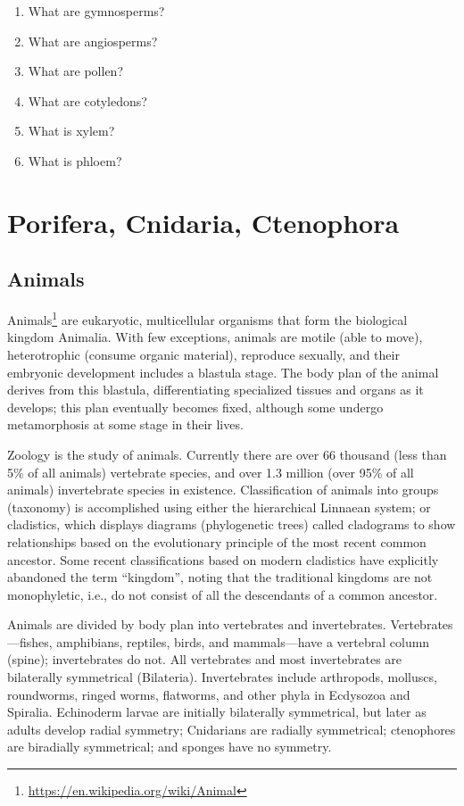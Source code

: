 \documentclass[]{book}
\providecommand{\tightlist}{%
  \setlength{\itemsep}{0pt}\setlength{\parskip}{0pt}}
\let\rmarkdownfootnote\footnote%
\def\footnote{\protect\rmarkdownfootnote}
\renewcommand{\href}[2]{#2\footnote{\url{#1}}}
\theoremstyle{definition}
\theoremstyle{definition}
\theoremstyle{definition}
\theoremstyle{remark}
\begin{document}
\begin{enumerate}
\def\labelenumi{\arabic{enumi}.}
\tightlist
\item
  What are gymnosperms?
\item
  What are angiosperms?
\item
  What are pollen?
\item
  What are cotyledons?
\item
  What is xylem?
\item
  What is phloem?
\end{enumerate}

\chapter{Porifera, Cnidaria,
Ctenophora}\label{porifera-cnidaria-ctenophora}

\section{Animals}\label{animals}

\href{https://en.wikipedia.org/wiki/Animal}{Animals} are eukaryotic,
multicellular organisms that form the biological kingdom Animalia. With
few exceptions, animals are motile (able to move), heterotrophic
(consume organic material), reproduce sexually, and their embryonic
development includes a blastula stage. The body plan of the animal
derives from this blastula, differentiating specialized tissues and
organs as it develops; this plan eventually becomes fixed, although some
undergo metamorphosis at some stage in their lives.

Zoology is the study of animals. Currently there are over 66 thousand
(less than 5\% of all animals) vertebrate species, and over 1.3 million
(over 95\% of all animals) invertebrate species in existence.
Classification of animals into groups (taxonomy) is accomplished using
either the hierarchical Linnaean system; or cladistics, which displays
diagrams (phylogenetic trees) called cladograms to show relationships
based on the evolutionary principle of the most recent common ancestor.
Some recent classifications based on modern cladistics have explicitly
abandoned the term ``kingdom'', noting that the traditional kingdoms are
not monophyletic, i.e., do not consist of all the descendants of a
common ancestor.

Animals are divided by body plan into vertebrates and invertebrates.
Vertebrates---fishes, amphibians, reptiles, birds, and mammals---have a
vertebral column (spine); invertebrates do not. All vertebrates and most
invertebrates are bilaterally symmetrical (Bilateria). Invertebrates
include arthropods, molluscs, roundworms, ringed worms, flatworms, and
other phyla in Ecdysozoa and Spiralia. Echinoderm larvae are initially
bilaterally symmetrical, but later as adults develop radial symmetry;
Cnidarians are radially symmetrical; ctenophores are biradially
symmetrical; and sponges have no symmetry.
\end{document}
